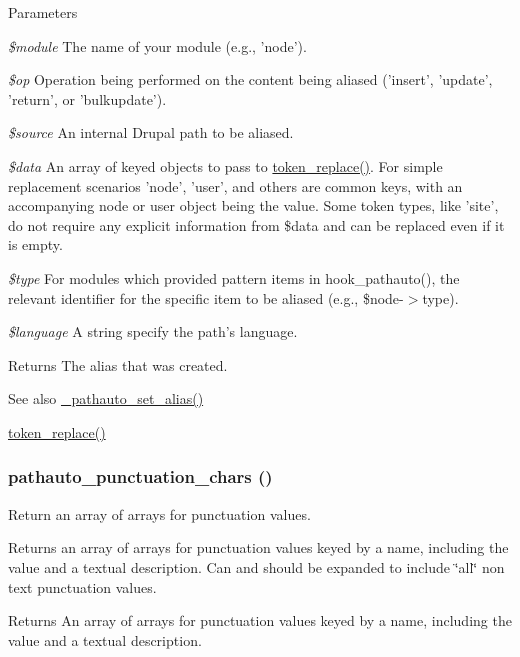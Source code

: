 \begin{DoxyParams}{Parameters}
\item[{\em \$module}]The name of your module (e.g., 'node'). \item[{\em \$op}]Operation being performed on the content being aliased ('insert', 'update', 'return', or 'bulkupdate'). \item[{\em \$source}]An internal Drupal path to be aliased. \item[{\em \$data}]An array of keyed objects to pass to \hyperlink{includes_2token_8inc_a47eb294b05ca8d04439a9a82ccc4d82a}{token\_\-replace()}. For simple replacement scenarios 'node', 'user', and others are common keys, with an accompanying node or user object being the value. Some token types, like 'site', do not require any explicit information from \$data and can be replaced even if it is empty. \item[{\em \$type}]For modules which provided pattern items in hook\_\-pathauto(), the relevant identifier for the specific item to be aliased (e.g., \$node-\/$>$type). \item[{\em \$language}]A string specify the path's language. \end{DoxyParams}
\begin{DoxyReturn}{Returns}
The alias that was created.
\end{DoxyReturn}
\begin{DoxySeeAlso}{See also}
\hyperlink{pathauto_8inc_a954e5a5c442176c91e5a8fead004f9f1}{\_\-pathauto\_\-set\_\-alias()} 

\hyperlink{includes_2token_8inc_a47eb294b05ca8d04439a9a82ccc4d82a}{token\_\-replace()} 
\end{DoxySeeAlso}
\hypertarget{pathauto_8inc_a939a77c5a4177051307d62aad585b74e}{
\subsubsection[{pathauto\_\-punctuation\_\-chars}]{\setlength{\rightskip}{0pt plus 5cm}pathauto\_\-punctuation\_\-chars ()}}
\label{pathauto_8inc_a939a77c5a4177051307d62aad585b74e}
Return an array of arrays for punctuation values.

Returns an array of arrays for punctuation values keyed by a name, including the value and a textual description. Can and should be expanded to include \char`\"{}all\char`\"{} non text punctuation values.

\begin{DoxyReturn}{Returns}
An array of arrays for punctuation values keyed by a name, including the value and a textual description. 
\end{DoxyReturn}

